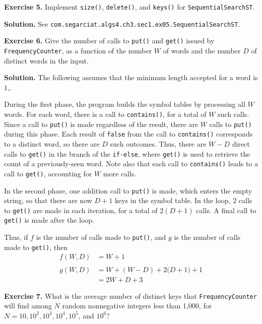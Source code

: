 \documentclass[12pt, a4paper]{article}
\newenvironment{ex}[2][Exercise]
{\par\medskip\noindent \textbf{#1 #2.}}
{\medskip}
\newenvironment{sol}[1][Solution]
{\par\medskip\noindent \textbf{#1.} }
{\medskip}
\begin{document}
	\begin{ex}{5}
		Implement \texttt{size()}, \texttt{delete()}, and \texttt{keys()} for
		\texttt{SequentialSearchST}.
	\end{ex}
	\begin{sol}
		See \texttt{com.segarciat.algs4.ch3.sec1.ex05.SequentialSearchST}.
	\end{sol}
	\begin{ex}{6}
		Give the number of calls to \texttt{put()} and \texttt{get()} issued by
		\texttt{FrequencyCounter}, as a function of the number $W$ of words and
		the number $D$ of distinct words in the input.
	\end{ex}
	\begin{sol}
		The following assumes that the minimum length accepted for a word is $1$,.
		
		During the first phase, the program builds the symbol tables by processing
		all $W$ words. For each word, there is a call to \texttt{contains()},
		for a total of $W$ such calls. Since a call to \texttt{put()} is made
		regardless of the result, there are $W$ calls to \texttt{put()} during
		this phase. Each result of \texttt{false} from the call to \texttt{contains()}
		corresponds to a distinct word, so there are $D$ such outcomes. Thus,
		there are $W-D$ direct calls to \texttt{get()} in the branch of the
		\texttt{if-else}, where \texttt{get()} is used to retrieve the count
		of a previously-seen word. Note also that each call to \texttt{contains()}
		leads to a call to \texttt{get()}, accounting for $W$ more calls.
		
		In the second phase, one addition call to \texttt{put()} is made, which enters the
		empty string, so that there are now $D+1$ keys in the symbol table.
		In the loop, $2$ calls to \texttt{get()} are made in each iteration, for
		a total of $2(D+1)$ calls. A final call to \texttt{get()} is made after the
		loop.
		
		Thus, if $f$ is the number of calls made to \texttt{put()}, and $g$
		is the number of calls made to \texttt{get()}, then
		\begin{align*}
			f(W, D) &= W + 1\\
			g(W, D) &= W + (W - D) + 2\dot (D+1)+1\\
			&=2W+D+3
		\end{align*}
	\end{sol}
		\begin{ex}{7}
		What is the average number of distinct keys that \texttt{FrequencyCounter} will
		find among $N$ random nonnegative integers less than 1,000, for
		$N=10,10^2,10^3,10^4,10^5$, and $10^6$?
	\end{ex}
\end{document}
